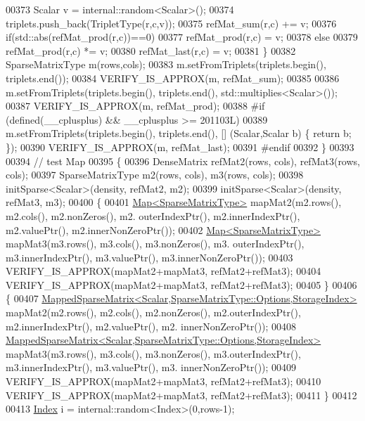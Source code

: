 \begin{DoxyCode}
00373       Scalar v = internal::random<Scalar>();
00374       triplets.push\_back(TripletType(r,c,v));
00375       refMat\_sum(r,c) += v;
00376       \textcolor{keywordflow}{if}(std::abs(refMat\_prod(r,c))==0)
00377         refMat\_prod(r,c) = v;
00378       \textcolor{keywordflow}{else}
00379         refMat\_prod(r,c) *= v;
00380       refMat\_last(r,c) = v;
00381     \}
00382     SparseMatrixType m(rows,cols);
00383     m.setFromTriplets(triplets.begin(), triplets.end());
00384     VERIFY\_IS\_APPROX(m, refMat\_sum);
00385 
00386     m.setFromTriplets(triplets.begin(), triplets.end(), std::multiplies<Scalar>());
00387     VERIFY\_IS\_APPROX(m, refMat\_prod);
00388 \textcolor{preprocessor}{#if (defined(\_\_cplusplus) && \_\_cplusplus >= 201103L)}
00389     m.setFromTriplets(triplets.begin(), triplets.end(), [] (Scalar,Scalar b) \{ \textcolor{keywordflow}{return} b; \});
00390     VERIFY\_IS\_APPROX(m, refMat\_last);
00391 \textcolor{preprocessor}{#endif}
00392   \}
00393   
00394   \textcolor{comment}{// test Map}
00395   \{
00396     DenseMatrix refMat2(rows, cols), refMat3(rows, cols);
00397     SparseMatrixType m2(rows, cols), m3(rows, cols);
00398     initSparse<Scalar>(density, refMat2, m2);
00399     initSparse<Scalar>(density, refMat3, m3);
00400     \{
00401       \hyperlink{group___core___module_class_eigen_1_1_map}{Map<SparseMatrixType>} mapMat2(m2.rows(), m2.cols(), m2.nonZeros(), m2.
      outerIndexPtr(), m2.innerIndexPtr(), m2.valuePtr(), m2.innerNonZeroPtr());
00402       \hyperlink{group___core___module_class_eigen_1_1_map}{Map<SparseMatrixType>} mapMat3(m3.rows(), m3.cols(), m3.nonZeros(), m3.
      outerIndexPtr(), m3.innerIndexPtr(), m3.valuePtr(), m3.innerNonZeroPtr());
00403       VERIFY\_IS\_APPROX(mapMat2+mapMat3, refMat2+refMat3);
00404       VERIFY\_IS\_APPROX(mapMat2+mapMat3, refMat2+refMat3);
00405     \}
00406     \{
00407       \hyperlink{class_eigen_1_1_mapped_sparse_matrix}{MappedSparseMatrix<Scalar,SparseMatrixType::Options,StorageIndex>}
       mapMat2(m2.rows(), m2.cols(), m2.nonZeros(), m2.outerIndexPtr(), m2.innerIndexPtr(), m2.valuePtr(), m2.
      innerNonZeroPtr());
00408       \hyperlink{class_eigen_1_1_mapped_sparse_matrix}{MappedSparseMatrix<Scalar,SparseMatrixType::Options,StorageIndex>}
       mapMat3(m3.rows(), m3.cols(), m3.nonZeros(), m3.outerIndexPtr(), m3.innerIndexPtr(), m3.valuePtr(), m3.
      innerNonZeroPtr());
00409       VERIFY\_IS\_APPROX(mapMat2+mapMat3, refMat2+refMat3);
00410       VERIFY\_IS\_APPROX(mapMat2+mapMat3, refMat2+refMat3);
00411     \}
00412 
00413     \hyperlink{namespace_eigen_a62e77e0933482dafde8fe197d9a2cfde}{Index} i = internal::random<Index>(0,rows-1);

\end{DoxyCode}
